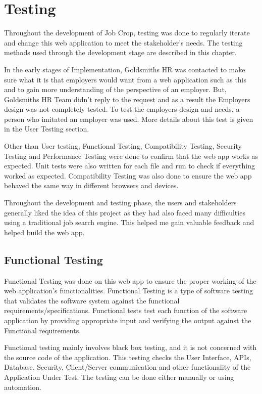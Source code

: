 \chapter{Testing}
Throughout the development of Job Crop, testing was done to regularly iterate and change this web application to meet the stakeholder's needs. The testing methods used through the development stage are described in this chapter.

In the early stages of Implementation, Goldsmiths HR was contacted to make sure what it is that employers would want from a web application such as this and to gain more understanding of the perspective of an employer. But, Goldsmiths HR Team didn't reply to the request and as a result the Employers design was not completely tested. To test the employers design and needs, a person who imitated an employer was used. More details about this test is given in the User Testing section.

Other than User testing, Functional Testing, Compatibility Testing, Security Testing and Performance Testing were done to confirm that the web app works as expected. Unit tests were also written for each file and run to check if everything worked as expected. Compatibility Testing was also done to ensure the web app behaved the same way in different browsers and devices.

Throughout the development and testing phase, the users and stakeholders generally liked the idea of this project as they had also faced many difficulties using a traditional job search engine. This helped me gain valuable feedback and helped build the web app.

\section{Functional Testing}
Functional Testing was done on this web app to ensure the proper working of the web application's functionalities. Functional Testing is a type of software testing that validates the software system against the functional requirements/specifications. Functional tests test each function of the software application by providing appropriate input and verifying the output against the Functional requirements. \parencite{Reference36}

Functional testing mainly involves black box testing, and it is not concerned with the source code of the application. This testing checks the User Interface, APIs, Database, Security, Client/Server communication and other functionality of the Application Under Test. The testing can be done either manually or using automation. 

